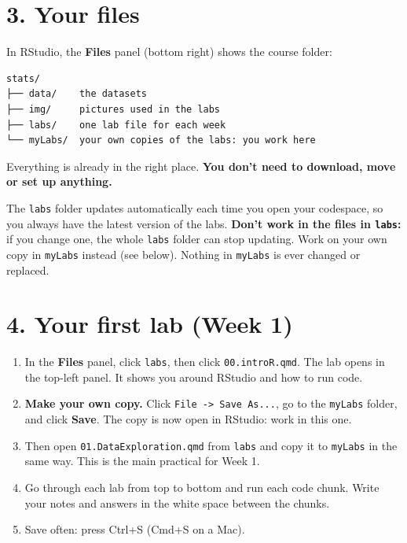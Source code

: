 \documentclass[
  letterpaper,
  DIV=11,
  numbers=noendperiod]{scrreprt}
\providecommand{\tightlist}{%
  \setlength{\itemsep}{0pt}\setlength{\parskip}{0pt}}
\begin{document}
\section*{3. Your files}\label{your-files}


In RStudio, the \textbf{Files} panel (bottom right) shows the course
folder:

\begin{verbatim}
stats/
├── data/    the datasets
├── img/     pictures used in the labs
├── labs/    one lab file for each week
└── myLabs/  your own copies of the labs: you work here
\end{verbatim}

Everything is already in the right place. \textbf{You don't need to
download, move or set up anything.}

The \texttt{labs} folder updates automatically each time you open your
codespace, so you always have the latest version of the labs.
\textbf{Don't work in the files in \texttt{labs}:} if you change one,
the whole \texttt{labs} folder can stop updating. Work on your own copy
in \texttt{myLabs} instead (see below). Nothing in \texttt{myLabs} is
ever changed or replaced.

\section*{4. Your first lab (Week 1)}\label{your-first-lab-week-1}


\begin{enumerate}
\def\labelenumi{\arabic{enumi}.}
\tightlist
\item
  In the \textbf{Files} panel, click \texttt{labs}, then click
  \texttt{00.introR.qmd}. The lab opens in the top-left panel. It shows
  you around RStudio and how to run code.
\item
  \textbf{Make your own copy.} Click
  \texttt{File\ -\textgreater{}\ Save\ As...}, go to the \texttt{myLabs}
  folder, and click \textbf{Save}. The copy is now open in RStudio: work
  in this one.
\item
  Then open \texttt{01.DataExploration.qmd} from \texttt{labs} and copy
  it to \texttt{myLabs} in the same way. This is the main practical for
  Week 1.
\item
  Go through each lab from top to bottom and run each code chunk. Write
  your notes and answers in the white space between the chunks.
\item
  Save often: press Ctrl+S (Cmd+S on a Mac).
\end{enumerate}
\end{document}
